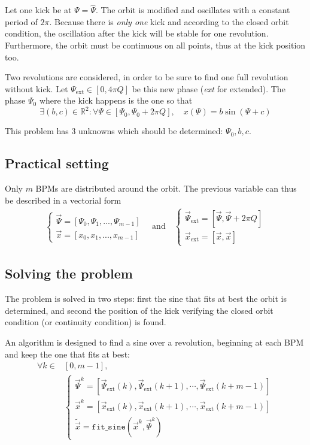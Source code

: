 Let one kick be at $\Psi = \hat{\Psi}$. The orbit is modified and oscillates with a constant period of $2 \pi$. Because there is {\em only one} kick and according to the closed orbit condition, the oscillation after the kick will be stable for one revolution. Furthermore, the orbit must be continuous on all points, thus at the kick position too.

Two revolutions are considered, in order to be sure to find one full revolution without kick. Let $\Psi_\mathrm{ext} \in [0, 4 \pi Q]$ be this new phase (\textit{ext} for extended). The phase $\Psi_0$ where the kick happens is the one so that 
\begin{equation}
\exists (b, c) \in \mathbb{R}^2:
\forall \Psi \in [\Psi_0, \Psi_0 + 2 \pi Q], \quad
x(\Psi) = b \sin(\Psi + c)
\end{equation}

This problem has 3 unknowns which should be determined: $\Psi_0, b, c$. 

\subsection{Practical setting}

Only $m$ BPMs are distributed around the orbit. The previous variable can thus be described in a vectorial form
\begin{align}
\begin{cases}
\vec{\Psi} = [\Psi_0, \Psi_1, ..., \Psi_{m-1}] \\
\vec{x} = [x_0, x_1, ..., x_{m-1}]
\end{cases} \quad \mathrm{and} \quad
\begin{cases}
\vec{\Psi}_\mathrm{ext} = [\vec{\Psi}, \vec{\Psi}+2\pi Q ]\\
\vec{x}_\mathrm{ext} = [\vec{x}, \vec{x}]
\end{cases}
\end{align}

\subsection{Solving the problem}

The problem is solved in two steps: first the sine that fits at best the orbit is determined, and second the position of the kick verifying the closed orbit condition (or continuity condition) is found.

An algorithm is designed to find a sine over a revolution, beginning at each BPM and keep the one that fits at best:
\begin{align}
\forall k \in &[0, m-1], \nonumber \\
&\begin{cases}
\vec{\Psi}^k = [\vec{\Psi}_\mathrm{ext}(k), \vec{\Psi}_\mathrm{ext}(k+1), \cdots,  \vec{\Psi}_\mathrm{ext}(k+m-1)]\\
\vec{x}^k = [\vec{x}_\mathrm{ext}(k), \vec{x}_\mathrm{ext}(k+1), \cdots,  \vec{x}_\mathrm{ext}(k+m-1)]\\
\tilde{\vec{x}} = \mathtt{fit\_sine}(\vec{x}^k, \vec{\Psi}^k)
\end{cases}
\end{align}

